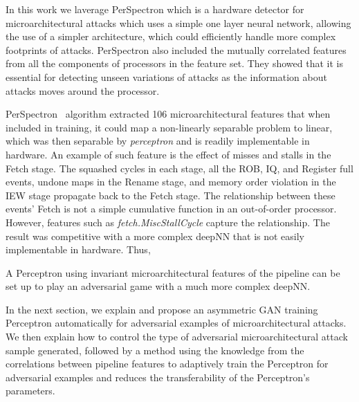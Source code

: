 
In this work we laverage PerSpectron which is a  hardware detector for microarchitectural attacks which uses a simple one layer neural network,  allowing the use of a simpler architecture, which could efficiently 
handle more complex footprints of attacks. 
PerSpectron also included the mutually correlated features from all the components of processors in the feature set. They showed that it is essential for detecting unseen variations of attacks as the information about attacks moves around the processor.


PerSpectron~\cite{PerSpectron} algorithm extracted 106 microarchitectural features that when included in training, it could map a non-linearly separable problem to linear, which was then 
separable by {\em perceptron} and is readily implementable in hardware. An example of such feature is the effect of misses and stalls 
in the Fetch stage. The squashed cycles in each stage, all the ROB, IQ, and 
Register full events, undone maps in the Rename stage, and memory order 
violation in the IEW stage propagate back to the Fetch stage. The relationship 
between these events' Fetch is not a simple cumulative function in an out-of-order 
processor. 
However, features such as \textit{fetch.MiscStallCycle} capture the 
relationship.
The result was competitive 
with a more complex deepNN that is not easily implementable in hardware. Thus, 

\begin{note}

A Perceptron using invariant microarchitectural features of the pipeline can be set up to play an adversarial game with a much more complex deepNN. 

% 
\end{note}
 
In the next section, we explain \scheme and propose an asymmetric GAN training Perceptron automatically for adversarial examples of microarchitectural attacks. We then explain how to control the type of adversarial microarchitectural attack sample generated, followed by a method using the knowledge from the correlations between pipeline features to adaptively train the Perceptron for adversarial examples and reduces the transferability of the Perceptron's parameters. 

